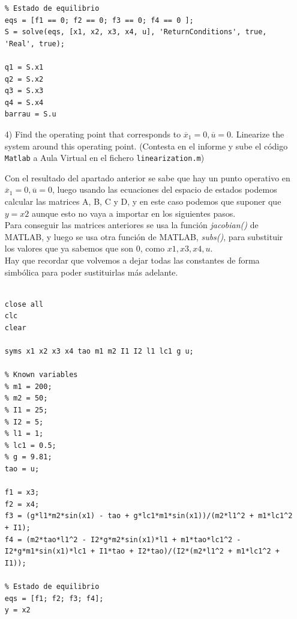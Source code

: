 \documentclass{article}
\begin{document}
\begin{itemize}
\begin{tcolorbox}[width=12cm, title={File \texttt{equilibrium.m}}]
\begin{scriptsize}
\begin{verbatim}
% Estado de equilibrio
eqs = [f1 == 0; f2 == 0; f3 == 0; f4 == 0 ];
S = solve(eqs, [x1, x2, x3, x4, u], 'ReturnConditions', true, 'Real', true);

q1 = S.x1
q2 = S.x2
q3 = S.x3
q4 = S.x4
barrau = S.u

\end{verbatim}
\end{scriptsize}
\end{tcolorbox}

\item[4)]  {\color{gray} Find the operating point that corresponds to $\overline{x}_1 = 0, \overline{u} = 0$. Linearize the system around this operating point.
(Contesta en el informe y sube el c\'odigo \texttt{Matlab} a Aula Virtual en el fichero \texttt{linearization.m})}

\bigskip

Con el resultado del apartado anterior se sabe que hay un punto operativo en $\overline{x}_1 = 0, \overline{u} = 0$, luego usando las ecuaciones del espacio de estados podemos calcular las matrices A, B, C y D, y en este caso podemos que suponer que $y=x{2}$ aunque esto no vaya a importar en los siguientes pasos.\\
Para conseguir las matrices anteriores se usa la función \textit{jacobian()} de MATLAB, y luego se usa otra función de MATLAB, \textit{subs()}, para substituir los valores que ya sabemos que son 0, como $x{1}, x{3}, x{4}, u$.\\
Hay que recordar que volvemos a dejar todas las constantes de forma simbólica para poder sustituirlas más adelante.

\bigskip

\begin{tcolorbox}[width=12cm, title={File \texttt{linearization.m}}]
\begin{scriptsize}
\begin{verbatim}

close all
clc
clear

syms x1 x2 x3 x4 tao m1 m2 I1 I2 l1 lc1 g u;

% Known variables
% m1 = 200;
% m2 = 50;
% I1 = 25;
% I2 = 5;
% l1 = 1;
% lc1 = 0.5;
% g = 9.81;
tao = u;

f1 = x3;
f2 = x4;
f3 = (g*l1*m2*sin(x1) - tao + g*lc1*m1*sin(x1))/(m2*l1^2 + m1*lc1^2 + I1);
f4 = (m2*tao*l1^2 - I2*g*m2*sin(x1)*l1 + m1*tao*lc1^2 - I2*g*m1*sin(x1)*lc1 + I1*tao + I2*tao)/(I2*(m2*l1^2 + m1*lc1^2 + I1));

% Estado de equilibrio
eqs = [f1; f2; f3; f4];
y = x2


\end{verbatim}
\end{scriptsize}
\end{tcolorbox}
\end{itemize}
\end{document}
